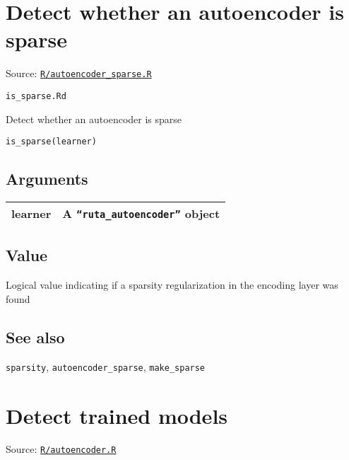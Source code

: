 \section{Detect whether an autoencoder is
sparse}\label{detect-whether-an-autoencoder-is-sparse}

Source:
\href{https://github.com/fdavidcl/ruta/blob/master/R/autoencoder_sparse.R}{\texttt{R/autoencoder\_sparse.R}}

\texttt{is\_sparse.Rd}

Detect whether an autoencoder is sparse

\begin{verbatim}
is_sparse(learner)
\end{verbatim}

\hypertarget{arguments}{\subsection{\texorpdfstring{\protect\hyperlink{arguments}{}Arguments}{Arguments}}\label{arguments}}

\begin{longtable}[c]{@{}>{\small}p{3cm}>{\raggedright}p{12.5cm}@{}}
\toprule
learner & A \texttt{``ruta\_autoencoder''} object\tabularnewline
\bottomrule
\end{longtable}

\hypertarget{value}{\subsection{\texorpdfstring{\protect\hyperlink{value}{}Value}{Value}}\label{value}}

Logical value indicating if a sparsity regularization in the encoding
layer was found

\hypertarget{see-also}{\subsection{\texorpdfstring{\protect\hyperlink{see-also}{}See
also}{See also}}\label{see-also}}

\texttt{sparsity}, \texttt{autoencoder\_sparse}, \texttt{make\_sparse}

\section{Detect trained models}\label{detect-trained-models}

Source:
\href{https://github.com/fdavidcl/ruta/blob/master/R/autoencoder.R}{\texttt{R/autoencoder.R}}

